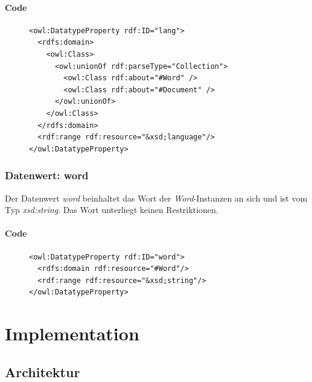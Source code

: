 \documentclass[draft,
    11pt,
    latin1,
    a4paper,
    oneside
]{scrreprt}
\let\oldemph=\emph
\renewcommand{\emph}[1]{\index{#1}\oldemph{#1}}
\begin{document}
\subsubsection{Code} \label{sec:data_lang_code}

\begin{figure}[H]
 \lstset{language=XML}
 \begin{lstlisting}[label=owl:lang,caption={Der Datenwert \emph{lang} gibt die Sprache eines Wortes oder Dokumentes an.}]
<owl:DatatypeProperty rdf:ID="lang">
  <rdfs:domain>
    <owl:Class>
      <owl:unionOf rdf:parseType="Collection">
        <owl:Class rdf:about="#Word" />
        <owl:Class rdf:about="#Document" />
      </owl:unionOf>
    </owl:Class>
  </rdfs:domain>
  <rdf:range rdf:resource="&xsd;language"/>
</owl:DatatypeProperty>
 \end{lstlisting}
\end{figure}


\subsection{Datenwert: word} \label{sec:data_word}

Der Datenwert \emph{word} beinhaltet das Wort der \emph{Word}-Instanzen an sich und ist vom Typ \emph{xsd:string}. Das Wort unterliegt keinen Restriktionen.

\subsubsection{Code} \label{sec:data_word_code}

\begin{figure}[H]
 \lstset{language=XML}
 \begin{lstlisting}[label=owl:word,caption={Der Datenwert \emph{word} beinhaltet das Word einer \emph{Word}-Instanz.}]
<owl:DatatypeProperty rdf:ID="word">
  <rdfs:domain rdf:resource="#Word"/>
  <rdf:range rdf:resource="&xsd;string"/>
</owl:DatatypeProperty>
 \end{lstlisting}
\end{figure}



\chapter{Implementation} \label{sec:implementation}

\section{Architektur} \label{sec:design}
\end{document}
